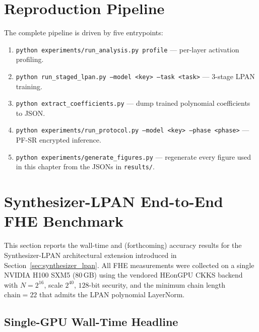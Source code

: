 \section{Reproduction Pipeline}
\label{sec:reproduction_pipeline}

The complete pipeline is driven by five entrypoints:
\begin{enumerate}
    \item \texttt{python experiments/run\_analysis.py profile} --- per-layer activation profiling.
    \item \texttt{python run\_staged\_lpan.py --model <key> --task <task>} --- 3-stage LPAN training.
    \item \texttt{python extract\_coefficients.py} --- dump trained polynomial coefficients to JSON.
    \item \texttt{python experiments/run\_protocol.py --model <key> --phase <phase>} --- PF-SR encrypted inference.
    \item \texttt{python experiments/generate\_figures.py} --- regenerate every figure used in this chapter from the JSONs in \texttt{results/}.
\end{enumerate}


\section{Synthesizer-LPAN End-to-End FHE Benchmark}
\label{sec:slpan_results}

This section reports the wall-time and (forthcoming) accuracy results for the Synthesizer-LPAN architectural extension introduced in Section~\ref{sec:synthesizer_lpan}. All FHE measurements were collected on a single NVIDIA H100 SXM5 (80\,GB) using the vendored HEonGPU CKKS backend~\cite{kim2024heongpu} with $N = 2^{16}$, scale $2^{40}$, $128$-bit security, and the minimum chain length $\mathrm{chain} = 22$ that admits the LPAN polynomial LayerNorm.

\subsection{Single-GPU Wall-Time Headline}
\label{sec:slpan_headline}

